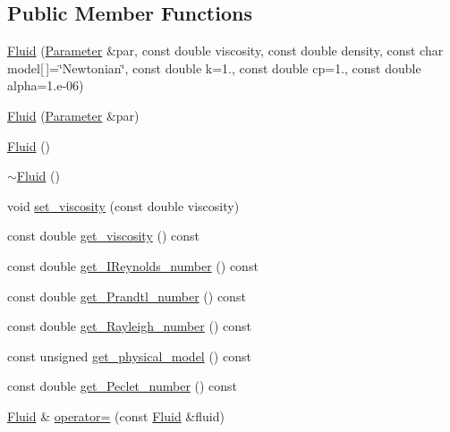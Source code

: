 \subsection*{Public Member Functions}
\begin{DoxyCompactItemize}
\item 
\mbox{\hyperlink{classfemus_1_1_fluid_a8d1831919f5338cfd229ae987f999907}{Fluid}} (\mbox{\hyperlink{classfemus_1_1_parameter}{Parameter}} \&par, const double viscosity, const double density, const char model\mbox{[}$\,$\mbox{]}=\char`\"{}Newtonian\char`\"{}, const double k=1., const double cp=1., const double alpha=1.e-\/06)
\item 
\mbox{\hyperlink{classfemus_1_1_fluid_a052d4f2d1abfd8a570e61c1447329f7c}{Fluid}} (\mbox{\hyperlink{classfemus_1_1_parameter}{Parameter}} \&par)
\item 
\mbox{\hyperlink{classfemus_1_1_fluid_af657120fb7459fb69fc49101818ea55c}{Fluid}} ()
\item 
\mbox{\hyperlink{classfemus_1_1_fluid_ad8a43d785da801087c8609cd14f609da}{$\sim$\+Fluid}} ()
\item 
void \mbox{\hyperlink{classfemus_1_1_fluid_ac53b9fafcb7e64adb950186182205ba9}{set\+\_\+viscosity}} (const double viscosity)
\item 
const double \mbox{\hyperlink{classfemus_1_1_fluid_a936acf71f4e2000195c889fe01a3619f}{get\+\_\+viscosity}} () const
\item 
const double \mbox{\hyperlink{classfemus_1_1_fluid_a7d9bc0a4418dd5fd799d5b053555bb81}{get\+\_\+\+I\+Reynolds\+\_\+number}} () const
\item 
const double \mbox{\hyperlink{classfemus_1_1_fluid_a74d6c2e5e08b7615a03f9b12be768b09}{get\+\_\+\+Prandtl\+\_\+number}} () const
\item 
const double \mbox{\hyperlink{classfemus_1_1_fluid_a64c60efe82b31eefa750265e063e7710}{get\+\_\+\+Rayleigh\+\_\+number}} () const
\item 
const unsigned \mbox{\hyperlink{classfemus_1_1_fluid_aebe2cca45e84639ff700d30b1aa67f25}{get\+\_\+physical\+\_\+model}} () const
\item 
const double \mbox{\hyperlink{classfemus_1_1_fluid_a598daf21fed5e9075249c001773d5b40}{get\+\_\+\+Peclet\+\_\+number}} () const
\item 
\mbox{\hyperlink{classfemus_1_1_fluid}{Fluid}} \& \mbox{\hyperlink{classfemus_1_1_fluid_ad8ceb155d9713388b23b58aef5b46a8b}{operator=}} (const \mbox{\hyperlink{classfemus_1_1_fluid}{Fluid}} \&fluid)
\end{DoxyCompactItemize}
